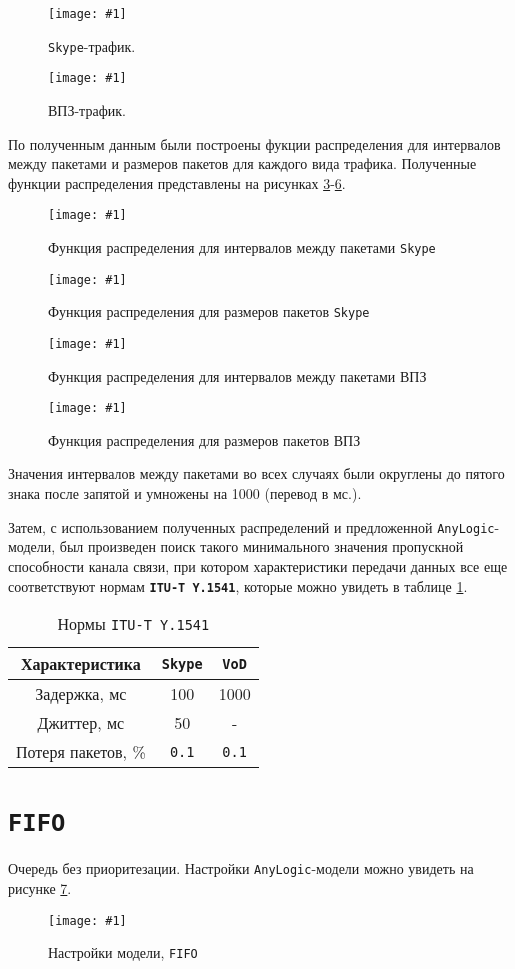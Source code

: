 \documentclass[12pt, a4paper]{article}
\newcommand{\figc}[4]{
  \begin{figure}[H]
  \begin{center}
    \texttt{[image: \#1]}
    \caption{#2}
    \label{fig:#3}
  \end{center}
  \end{figure}
}
\begin{document}
\figc{skype_traffic}{\texttt{Skype}-трафик.}{s_t}{1.0}
\figc{vod_traffic}{ВПЗ-трафик.}{v_t}{0.8}

По полученным данным были построены фукции распределения для интервалов
между пакетами и размеров пакетов для каждого вида трафика. Полученные
функции распределения представлены на рисунках \ref{fig:s_f}-\ref{fig:v_s}.

\figc{charts/skype_f_time}{Функция распределения для интервалов между пакетами \texttt{Skype}}{s_f}{0.75}
\figc{charts/skype_f_size}{Функция распределения для размеров пакетов \texttt{Skype}}{s_s}{0.75}
\figc{charts/vod_f_time}{Функция распределения для интервалов между пакетами ВПЗ}{v_f}{0.75}
\figc{charts/vod_f_size}{Функция распределения для размеров пакетов ВПЗ}{v_s}{0.75}

Значения интервалов между пакетами во всех случаях были округлены до
пятого знака после запятой и умножены на 1000 (перевод в мс.).

Затем, с использованием полученных распределений и предложенной
\texttt{AnyLogic}-модели, был произведен поиск такого минимального значения
пропускной способности канала связи, при котором характеристики передачи
данных все еще соответствуют нормам \textbf{\texttt{ITU-T Y.1541}}, которые можно
увидеть в таблице \ref{Tab:itu}.

\begin{table}[H]
  \begin{center}
  \caption{Нормы \texttt{ITU-T Y.1541}}
  \begin{tabular}{| c | c | c |}
    \hline
    Характеристика & \texttt{Skype} & \texttt{VoD}\\\hline
    Задержка, мс & 100 & 1000\\\hline
    Джиттер, мс & 50 & -\\\hline
    Потеря пакетов, \% & \texttt{0.1} & \texttt{0.1}\\\hline
  \end{tabular}
  \label{Tab:itu}
  \end{center}
\end{table}

\section{\texttt{FIFO}}

Очередь без приоритезации. Настройки \texttt{AnyLogic}-модели можно увидеть
на рисунке \ref{fig:f_set}.

\figc{bp/settings}{Настройки модели, \texttt{FIFO}}{f_set}{1.0}
\end{document}
